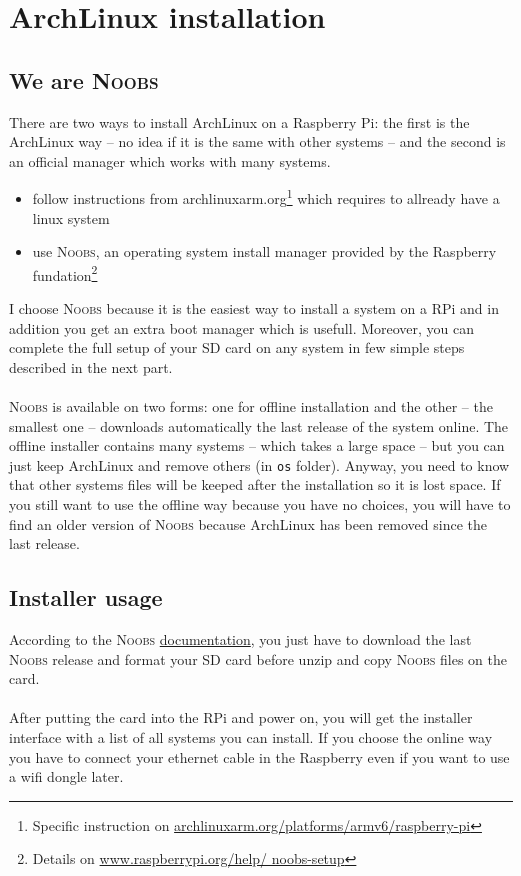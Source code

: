 \chapter{ArchLinux installation}
\section{We are \textsc{Noobs}}
There are two ways to install ArchLinux on a Raspberry Pi: the first is 
the ArchLinux way -- no idea if it is the same with other systems -- and 
the second is an official manager which works with many systems.

\begin{itemize}
	\item follow instructions from archlinuxarm.org\footnote{Specific 
		  instruction on \href{http://archlinuxarm.org/platforms/armv6/
		  raspberry-pi}{archlinuxarm.org/platforms/armv6/raspberry-pi}} which 
		  requires to allready have a linux system
		  
	\item use \textsc{Noobs}, an operating system install manager provided by 
		  the Raspberry fundation\footnote{Details on \href{http://
		  www.raspberrypi.org/help/noobs-setup}{www.raspberrypi.org/help/
		  noobs-setup}}\\
\end{itemize}

I choose \textsc{Noobs} because it is the easiest way to install a
system on a RPi and in addition you get an extra \og{}boot manager\fg{} which 
is usefull. Moreover, you can complete the full setup of your SD card on any 
system in few simple steps described in the next part.
\\\\
\textsc{Noobs} is available on two forms: one for offline installation 
and the other -- the smallest one -- downloads automatically the last release 
of the system online. The offline installer contains many systems -- which 
takes a large space -- but you can just keep ArchLinux and remove others 
(in \texttt{os} folder). Anyway, you need to know that other systems files 
will be keeped after the installation so it is lost space. If you still want 
to use the offline way because you have no choices, you will have to find  
an older version of \textsc{Noobs} because ArchLinux has been removed since  
the last release.

\section{Installer usage}
According to the \textsc{Noobs} \href{http://www.raspberrypi.org/help/
noobs-setup}{documentation}, you just have to download the last \textsc{Noobs} 
release and format your SD card before unzip and copy \textsc{Noobs} files on 
the card.
\\\\
After putting the card into the RPi and power on, you will get the 
installer interface with a list of all systems you can install. If you choose 
the online way you have to connect your ethernet cable in the Raspberry even 
if you want to use a wifi dongle later.

